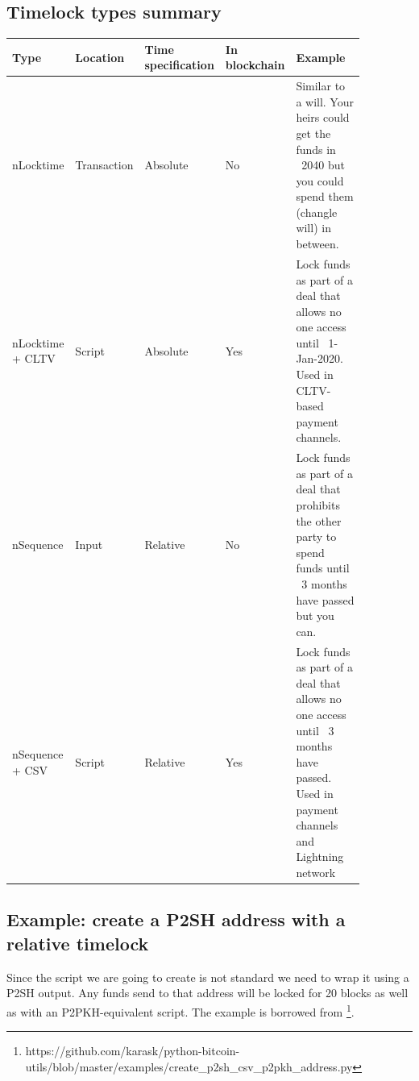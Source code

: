 \subsection*{Timelock types summary}

\begin{table}[h]
\centering
\begin{tabular}[H]{ |C{0.12\linewidth}|C{0.13\linewidth}|C{0.12\linewidth}|C{0.12\linewidth}|L{0.38\linewidth}| }
\hline
\textbf{Type} & \textbf{Location} & \textbf{Time specification} & \textbf{In blockchain} & \textbf{Example}\\
\hline
nLocktime & Transaction & Absolute & No & Similar to a will. Your heirs could get the funds in ~2040 but you could spend them (changle will) in between.\\
\hline
nLocktime + CLTV & Script & Absolute & Yes & Lock funds as part of a deal that allows no one access until ~1-Jan-2020. Used in CLTV-based payment channels.\\
\hline
nSequence & Input & Relative & No & Lock funds as part of a deal that prohibits the other party to spend funds until ~3 months have passed but you can.\\
\hline
nSequence + CSV & Script & Relative & Yes & Lock funds as part of a deal that allows no one access until ~3 months have passed. Used in payment channels and Lightning network\\
\hline
\end{tabular}
\end{table}



\subsection*{Example: create a P2SH address with a relative timelock}
\label{ssec:p2sh-csv-address-example}
Since the script we are going to create is not standard we need to wrap it using a P2SH output. Any funds send to that address will be locked for 20 blocks as well as with an P2PKH-equivalent script. The example is borrowed from \footnote{https://github.com/karask/python-bitcoin-utils/blob/master/examples/create\_p2sh\_csv\_p2pkh\_address.py}.

